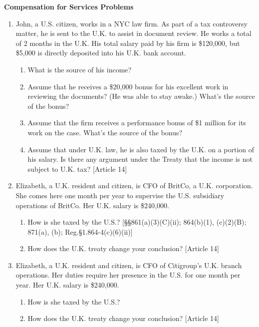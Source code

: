 	\begin{center}
		\textbf{Compensation for Services Problems}
	\end{center}
	\begin{select}
\begin{enumerate}
	
			
	\item John, a U.S. citizen, works in a NYC law firm.  As part of a tax controversy matter, he is sent to the U.K. to assist in document review.  He works a total of 2 months in the U.K.  His total salary paid by his firm is \$120,000, but \$5,000 is directly deposited into his U.K. bank account.  
		\begin{enumerate}
			\item What is the source of his income?
			\item Assume that he receives a \$20,000 bonus for his excellent work in reviewing the documents? (He was able to stay awake.)  What's the source of the bonus?
			\item Assume that the firm receives a performance bonus of \$1 million for its work on the case.  What's the source of the bonus?
			\item Assume that under U.K. law, he is also taxed by the U.K. on a portion of his salary.  Is there any argument under the Treaty that the income is not subject to U.K. tax? [Article 14]
		\end{enumerate}
		
	\item Elizabeth, a U.K. resident and citizen, is CFO of BritCo, a U.K. corporation.  She comes here one month per year to supervise the U.S. subsidiary operations of BritCo.  Her U.K. salary is \$240,000.
		     \begin{enumerate}
				\item How is she taxed by the U.S.? [\S\S 861(a)(3)(C)(ii); 864(b)(1), (c)(2)(B); 871(a), (b); Reg.\@ \S 1.864-4(c)(6)(ii)] 
				\item How does the U.K. treaty change your conclusion? [Article 14]
			\end{enumerate}
			
			\item Elizabeth, a U.K. resident and citizen, is CFO of Citigroup's U.K. branch operations.  Her duties require her presence in the U.S. for one month per year. Her U.K. salary is \$240,000.
		     \begin{enumerate}
				\item How is she taxed by the U.S.?
				\item How does the U.K. treaty change your conclusion? [Article 14]
			\end{enumerate}
			

\end{enumerate}
\end{select}
